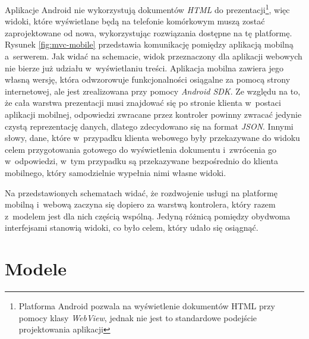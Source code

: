 \documentclass[11pt]{aghdpl}
\begin{document}
Aplikacje Android nie wykorzystują dokumentów \emph{HTML} do prezentacji\footnote{Platforma Android pozwala na wyświetlenie dokumentów HTML przy pomocy klasy \emph{WebView}, jednak nie jest to standardowe podejście projektowania aplikacji}, więc widoki, które wyświetlane będą na telefonie komórkowym muszą zostać zaprojektowane od nowa, wykorzystując rozwiązania dostępne na tę platformę. Rysunek \ref{fig:mvc-mobile} przedstawia komunikację pomiędzy aplikacją mobilną a~serwerem. Jak widać na schemacie, widok przeznaczony dla aplikacji webowych nie bierze już udziału w~wyświetlaniu treści. Aplikacja mobilna zawiera jego własną wersję, która odwzorowuje funkcjonalności osiągalne za pomocą strony internetowej, ale jest zrealizowana przy pomocy \emph{Android SDK}. Ze względu na to, że cała warstwa prezentacji musi znajdować się po stronie klienta w~postaci aplikacji mobilnej, odpowiedzi zwracane przez kontroler powinny zwracać jedynie czystą reprezentację danych, dlatego zdecydowano się na format \emph{JSON}. Innymi słowy, dane, które w~przypadku klienta webowego były przekazywane do widoku celem przygotowania gotowego do wyświetlenia dokumentu i~zwrócenia go w~odpowiedzi, w~tym przypadku są przekazywane bezpośrednio do klienta mobilnego, który samodzielnie wypełnia nimi własne widoki.

Na przedstawionych schematach widać, że rozdwojenie usługi na platformę mobilną i~webową zaczyna się dopiero za warstwą kontrolera, który razem z~modelem jest dla nich częścią wspólną. Jedyną różnicą pomiędzy obydwoma interfejsami stanowią widoki, co było celem, który udało się osiągnąć.

\section{Modele}
\label{sec:modele}
\end{document}

